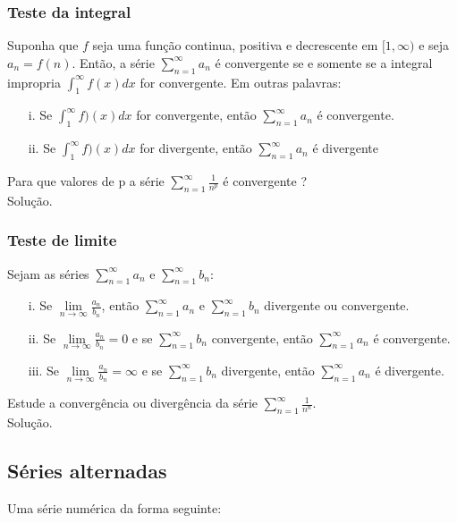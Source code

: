 \subsubsection{Teste da integral}
Suponha que $f$ seja uma função continua, positiva e decrescente em $[1,\infty)$ e seja $a_{n}=f(n)$. Então, a série $\sum_{n=1}^{\infty}a_{n}$ é convergente se e somente se a integral impropria $\int_{1}^{\infty}f(x)dx$ for convergente. Em outras palavras:\\

\begin{itemize}
	\item[i.] Se $\int_{1}^{\infty}f)(x)dx$ for convergente, então $\sum_{n=1}^{\infty}a_{n}$ é convergente.
	\item[ii.] Se $\int_{1}^{\infty}f)(x)dx$ for divergente, então $\sum_{n=1}^{\infty}a_{n}$ é divergente
\end{itemize}
\begin{ex}
	Para que valores de p a série $\sum_{n=1}^{\infty}\frac{1}{n^{p}}$ é convergente ?\\
	Solução.
\end{ex}
\vspace*{8cm}
\subsubsection{Teste de limite}
Sejam as séries $\sum_{n=1}^{\infty}a_{n}$ e $\sum_{n=1}^{\infty}b_{n}$: \\
\begin{itemize}
	\item[i.] Se $\lim\limits_{n\rightarrow \infty}\frac{a_{n}}{b_{n}}$, então $\sum_{n=1}^{\infty}a_{n}$ e $\sum_{n=1}^{\infty}b_{n}$ divergente ou convergente.
	\item[ii.] Se $\lim\limits_{n\rightarrow \infty}\frac{a_{n}}{b_{n}}=0$ e se $\sum_{n=1}^{\infty}b_{n}$ convergente, então $\sum_{n=1}^{\infty}a_{n}$ é convergente.
	\item[iii.] Se $\lim\limits_{n\rightarrow \infty}\frac{a_{n}}{b_{n}}=\infty$ e se $\sum_{n=1}^{\infty}b_{n}$ divergente, então $\sum_{n=1}^{\infty}a_{n}$ é divergente.
\end{itemize} 
\begin{ex}
	Estude a convergência ou divergência da série $\sum_{n=1}^{\infty}\frac{1}{n^{n}}$.\\
	Solução.
\end{ex}
\vspace*{7cm}
\subsection{Séries alternadas}
Uma série numérica da forma seguinte:\\


